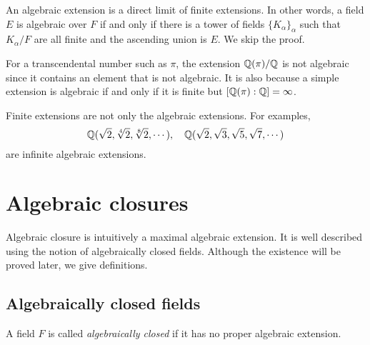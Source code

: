 \documentclass{../note}
\begin{document}
\begin{rmk}
An algebraic extension is a direct limit of finite extensions.
In other words, a field $E$ is algebraic over $F$ if and only if there is a tower of fields $\{K_\alpha\}_\alpha$ such that $K_\alpha/F$ are all finite and the ascending union is $E$.
We skip the proof.
\end{rmk}



\begin{ex}
For a transcendental number such as $\pi$, the extension $\mathbb{Q}(\pi)/\mathbb{Q}$ is not algebraic since it contains an element that is not algebraic.
It is also because a simple extension is algebraic if and only if it is finite but $[\mathbb{Q}(\pi):\mathbb{Q}]=\infty$.
\end{ex}

\begin{ex}
Finite extensions are not only the algebraic extensions.
For examples,
\[\mathbb{Q}(\sqrt2,\sqrt[4]2,\sqrt[8]2,\cdots),\quad\mathbb{Q}(\sqrt2,\sqrt3,\sqrt5,\sqrt7,\cdots)\]
are infinite algebraic extensions.
\end{ex}








\section{Algebraic closures}

Algebraic closure is intuitively a maximal algebraic extension.
It is well described using the notion of algebraically closed fields.
Although the existence will be proved later, we give definitions.

\subsection{Algebraically closed fields}
\begin{defn}
A field $F$ is called \emph{algebraically closed} if it has no proper algebraic extension.
\end{defn}
\end{document}
